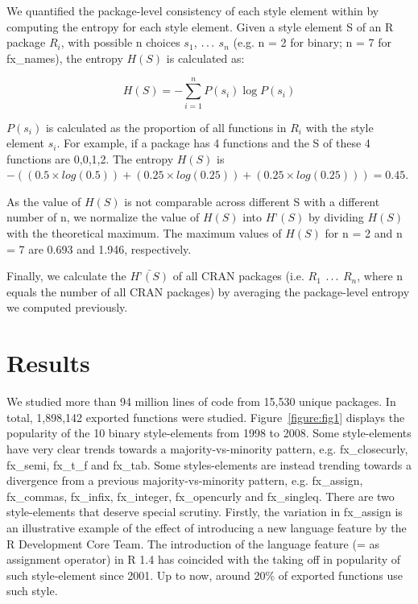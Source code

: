 We quantified the package-level consistency of each style element within by computing the entropy for each style element. Given a style element S of an R package $R_{i}$, with possible n choices $s_{1}$, $\mathellipsis$ $s_{n}$ (e.g. n = 2 for binary; n = 7 for fx\_names), the entropy $H(S)$ is calculated as:

\begin{equation} \label{eqn}
H(S) = - \sum_{i = 1}^{n} P(s_{i}) \log P(s_{i})
\end{equation}

$P(s_{i})$ is calculated as the proportion of all functions in $R_{i}$ with the style element $s_{i}$. For example, if a package has 4 functions and the S of these 4 functions are {0,0,1,2}. The entropy $H(S)$ is $- ((0.5 \times log(0.5)) + (0.25 \times log(0.25)) + (0.25 \times log(0.25))) = 0.45$.

As the value of $H(S)$ is not comparable across different S with a different number of n, we normalize the value of $H(S)$ into $H’(S)$ by dividing $H(S)$ with the theoretical maximum. The maximum values of $H(S)$ for n = 2 and n = 7 are 0.693 and 1.946, respectively.

Finally, we calculate the $\bar{H’(S)}$ of all CRAN packages (i.e. $R_{1}$ $\mathellipsis$ $R_{n}$, where n equals the number of all CRAN packages) by averaging the package-level entropy we computed previously.

\section{Results}

We studied more than 94 million lines of code from 15,530 unique packages. In total, 1,898,142 exported functions were studied. Figure~\ref{figure:fig1} displays the popularity of the 10 binary style-elements from 1998 to 2008. Some style-elements have very clear trends towards a majority-vs-minority pattern, e.g. fx\_closecurly, fx\_semi, fx\_t\_f and fx\_tab. Some styles-elements are instead trending towards a divergence from a previous majority-vs-minority pattern, e.g. fx\_assign, fx\_commas, fx\_infix, fx\_integer, fx\_opencurly and fx\_singleq. There are two style-elements that deserve special scrutiny. Firstly, the variation in fx\_assign is an illustrative example of the effect of introducing a new language feature by the R Development Core Team. The introduction of the language feature (= as assignment operator) in R 1.4 \citep{chambers} has coincided with the taking off in popularity of such style-element since 2001. Up to now, around 20\% of exported functions use such style.

